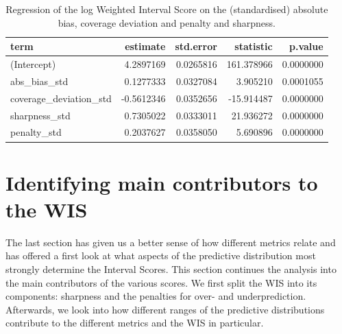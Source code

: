 \documentclass[
]{book}
\begin{document}
\begin{table}

\caption{\label{tab:regression-wis-metrics}Regression of the log Weighted Interval Score on the (standardised) absolute bias, coverage deviation and penalty and sharpness.}
\centering
\begin{tabular}[t]{lrrrr}
\toprule
term & estimate & std.error & statistic & p.value\\
\midrule
(Intercept) & 4.2897169 & 0.0265816 & 161.378966 & 0.0000000\\
abs\_bias\_std & 0.1277333 & 0.0327084 & 3.905210 & 0.0001055\\
coverage\_deviation\_std & -0.5612346 & 0.0352656 & -15.914487 & 0.0000000\\
sharpness\_std & 0.7305022 & 0.0333011 & 21.936272 & 0.0000000\\
penalty\_std & 0.2037627 & 0.0358050 & 5.690896 & 0.0000000\\
\bottomrule
\end{tabular}
\end{table}

\hypertarget{contributors}{%
\section{Identifying main contributors to the WIS}\label{contributors}}

The last section has given us a better sense of how different metrics relate and has offered a first look at what aspects of the predictive distribution most strongly determine the Interval Scores. This section continues the analysis into the main contributors of the various scores. We first split the WIS into its components: sharpness and the penalties for over- and underprediction. Afterwards, we look into how different ranges of the predictive distributions contribute to the different metrics and the WIS in particular.
\end{document}
